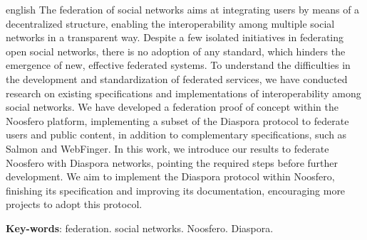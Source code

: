 \begin{resumo}[Abstract]
  \begin{otherlanguage*}{english}
    The federation of social networks aims at integrating users by means of a
    decentralized structure, enabling the interoperability among multiple social
    networks in a transparent way. Despite a few isolated initiatives in federating
    open social networks, there is no adoption of any standard, which hinders the
    emergence of new, effective federated systems.  To understand the difficulties
    in the development and standardization of federated services, we have conducted
    research on existing specifications and implementations of interoperability
    among social networks.  We have developed a federation proof of concept within
    the Noosfero platform, implementing a subset of the Diaspora protocol to
    federate users and public content, in addition to complementary specifications,
    such as Salmon and WebFinger. In this work, we introduce our results to
    federate Noosfero with Diaspora networks, pointing the required steps before
    further development. We aim to implement the Diaspora protocol within Noosfero,
    finishing its specification and improving its documentation, encouraging more
    projects to adopt this protocol.

    \vspace{\onelineskip}

    \noindent
    \textbf{Key-words}: federation. social networks. Noosfero. Diaspora.
  \end{otherlanguage*}
\end{resumo}
